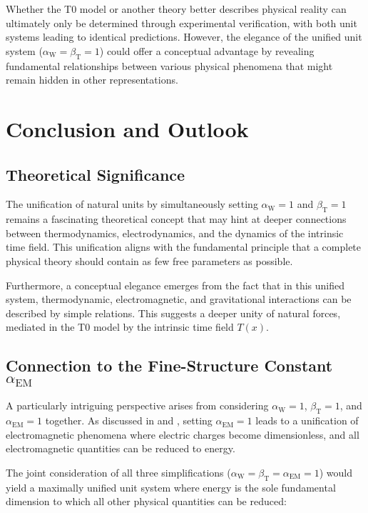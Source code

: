 \documentclass[12pt,a4paper]{article}
\newcommand{\Tfield}{T(x)}
\newcommand{\betaT}{\beta_{\text{T}}}
\newcommand{\alphaEM}{\alpha_{\text{EM}}}
\newcommand{\alphaW}{\alpha_{\text{W}}}
\begin{document}
	Whether the T0 model or another theory better describes physical reality can ultimately only be determined through experimental verification, with both unit systems leading to identical predictions. However, the elegance of the unified unit system (\(\alphaW = \betaT = 1\)) could offer a conceptual advantage by revealing fundamental relationships between various physical phenomena that might remain hidden in other representations.
	
	\section{Conclusion and Outlook}
	
	\subsection{Theoretical Significance}
	
	The unification of natural units by simultaneously setting \(\alphaW = 1\) and \(\betaT = 1\) remains a fascinating theoretical concept that may hint at deeper connections between thermodynamics, electrodynamics, and the dynamics of the intrinsic time field. This unification aligns with the fundamental principle that a complete physical theory should contain as few free parameters as possible.
	
	Furthermore, a conceptual elegance emerges from the fact that in this unified system, thermodynamic, electromagnetic, and gravitational interactions can be described by simple relations. This suggests a deeper unity of natural forces, mediated in the T0 model by the intrinsic time field \(\Tfield\).
	
	\subsection{Connection to the Fine-Structure Constant \(\alphaEM\)}
	
	A particularly intriguing perspective arises from considering \(\alphaW = 1\), \(\betaT = 1\), and \(\alphaEM = 1\) together. As discussed in \cite{pascher_alpha_2025} and \cite{pascher_alphabeta_2025}, setting \(\alphaEM = 1\) leads to a unification of electromagnetic phenomena where electric charges become dimensionless, and all electromagnetic quantities can be reduced to energy.
	
	The joint consideration of all three simplifications (\(\alphaW = \betaT = \alphaEM = 1\)) would yield a maximally unified unit system where energy is the sole fundamental dimension to which all other physical quantities can be reduced:
	
\end{document}
